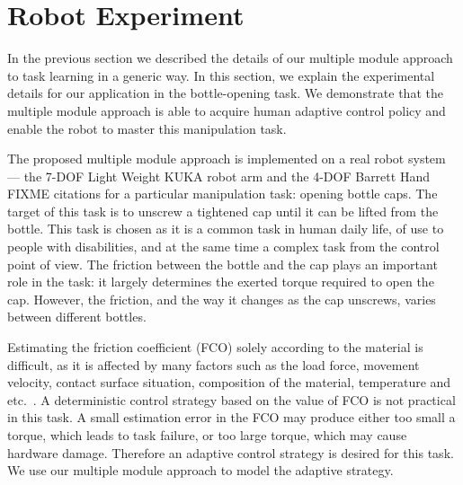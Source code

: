 \section{Robot Experiment}
\label{sec:exp}

In the previous section we described the details of our multiple
module approach to task learning in a generic way.  In this section,
we explain the experimental details for our application in the
bottle-opening task.  We demonstrate that the multiple module approach
is able to acquire human adaptive control policy and enable the robot
to master this manipulation task.

The proposed multiple module approach is implemented on a real robot
system --- the 7-DOF Light Weight KUKA robot arm and the 4-DOF Barrett
Hand FIXME citations %
for a particular manipulation task: opening bottle caps. The target of
this task is to unscrew a tightened cap until it can be lifted from
the bottle.  This task is chosen as it is a common task in human daily
life, of use to people with disabilities, and at the same time a
complex task from the control point of view.  The friction between the
bottle and the cap plays an important role in the task: it largely
determines the exerted torque required to open the cap. However, the
friction, and the way it changes as the cap unscrews, varies
between different bottles.

Estimating the friction coefficient (FCO) solely according to the
material is difficult, as it is affected by many factors such as the
load force, movement velocity, contact surface situation, composition
of the material, temperature and
etc.~\citep{gustafssoninvestigation}. A deterministic control strategy
based on the value of FCO is not practical in this task. A small
estimation error in the FCO may produce either too small a torque,
which leads to task failure, or too large torque, which may cause
hardware damage. Therefore an adaptive control strategy is desired for
this
task. %
We use our multiple module approach to model the adaptive strategy.



